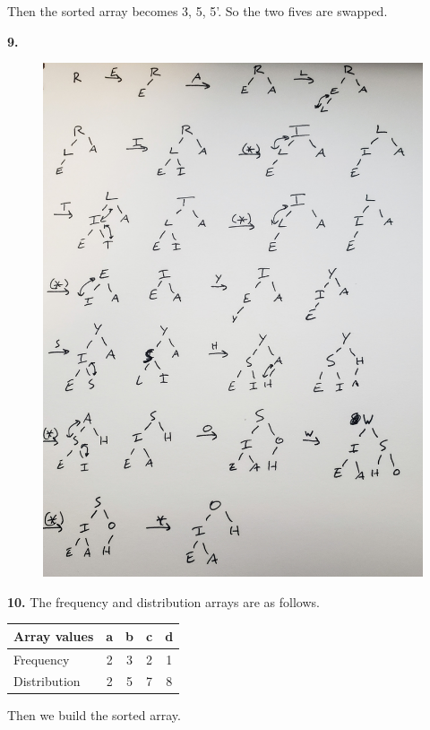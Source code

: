 \documentclass[letterpaper, 11pt]{article}
\newcommand{\hwnumber}[1]{\newpage \noindent\textbf{#1.} \smallskip}
\begin{document}
Then the sorted array becomes 3, 5, 5'. So the two fives are swapped. 

\hwnumber{9}
\begin{figure}[h!]
  \centering
  \includegraphics[width=\linewidth]{pics/num_9.jpg}
\end{figure}

\hwnumber{10}
The frequency and distribution arrays are as follows.

\begin{center}
  \begin{tabular}{l | c c c c}
    Array values & a & b & c & d\\
    \hline
    Frequency & 2 & 3 & 2 & 1\\
    Distribution & 2 & 5 & 7 & 8
  \end{tabular}
\end{center}

Then we build the sorted array.
\end{document}
